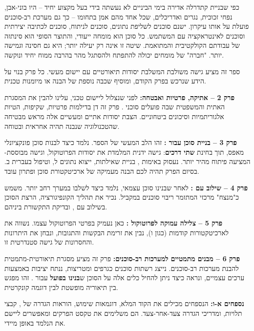 כפי שבניית קתדרלה אדירה בימי הביניים לא נעשתה בידי בעל מקצוע יחיד – היו בוני-אבן, נפחי זכוכית, נגרים ואדריכלים, שכל אחד מהם אמן בתחומו – כך גם מערכת רב-סוכנים פועלת על אותו עיקרון. ישנם סוכנים לשליפת נתונים, סוכנים לניתוח, סוכנים לכתיבה יצירתית וסוכנים לאינטראקציה עם המשתמש. כל סוכן הוא מומחה ייעודי, והתוצר הסופי הוא סינתזה של עבודתם הקולקטיבית והמתואמת. שיטה זו אינה רק יעילה יותר; היא גם חסינה וגמישה יותר. "חברה" של מומחים יכולה להתפתח ולהסתגל מהר בהרבה ממוח יחיד ונוקשה\cite{Hendrycks2024}.


ספר זה מציע גישה משולבת המשלבת יסודות תיאורטיים עם יישום מעשי. כל פרק בנוי על הידע שנרכש בפרק הקודם, ומוסיף שכבה נוספת של הבנה או מיומנות טכנית.

\textbf{פרק \num{2} – אתיקה, פרטיות ואבטחה:} לפני שנצלול ליישום טכני, עלינו להבין את המסגרת האתית והמשפטית שבה פועלים סוכני . פרק זה דן בדילמות פרטיות, שקיפות, הטיות אלגוריתמיות וסיכונים ביטחוניים. הצבת יסודות אתיים ומעשיים אלה מראש מבטיחה שהטכנולוגיה שנבנה תהיה אחראית ובטוחה.

\textbf{פרק \num{3} – בניית סוכן  עבור :} זהו הלב המעשי של הספר. נלמד כיצד לבנות סוכן פונקציונלי מאפס, תוך בחינת \textbf{שתי דרכים}: גישה ידנית המלמדת את יסודות הפרוטוקול, וגישה מבוססת- המציעה פיתוח מהיר יותר. נעסוק באימות , בניית שאילתות, ייצוא נתונים ל, וטיפול בעברית ב. בסיום הפרק תהיה לכם הבנה מעמיקה של ארכיטקטורת סוכן ופתרון עובד.

\textbf{פרק \num{4} – שילוב עם :} לאחר שבנינו סוכן עצמאי, נלמד כיצד לשלבו במערך רחב יותר.  משמש כ"מנצח" מרכזי המתזמר ריבוי סוכנים במקביל. נכיר את תהליך הקונפיגורציה, הרצת הסוכן בשילוב עם , ובדיקת התקשורת ביניהם.

\textbf{פרק \num{5} – צלילה עמוקה לפרוטוקול :} כאן נעמיק בפרטי הפרוטוקול עצמו. נשווה את  לארכיטקטורות קודמות (כגון  ו), נבין את זרימת הבקשות והתגובות, ונבחן את היתרונות והחסרונות של גישה סטנדרטית זו.

\textbf{פרק \num{6} – מבנים מתמטיים למערכות רב-סוכנים:} פרק זה מציע מסגרת תיאורטית-מתמטית להבנת מערכות רב-סוכנים. נייצג רשתות סוכנים כגרפים ומטריצות, ננתח יציבות באמצעות ערכים עצמיים, ונראה כיצד ניתן להחיל כלים אלה על הסוכן ש\textbf{בנינו בפועל} עבור . זהו מפגש בין תיאוריה מופשטת לבין דוגמה קונקרטית.

\textbf{נספחים א-ו:} הנספחים מכילים את הקוד המלא, דוגמאות שימוש, הוראות הגדרה של , קבצי תלויות, ומדריכי הגדרה צעד-אחר-צעד. הם משלימים את טקסט הפרקים ומאפשרים ליישם את הנלמד באופן מיידי.

